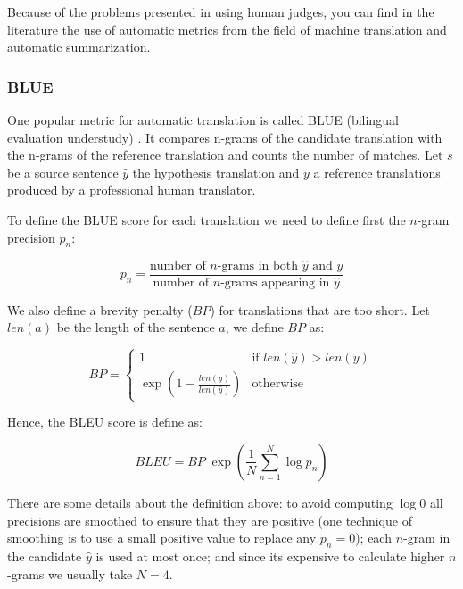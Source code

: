 Because of the problems presented in using human judges, you can find in the literature the use of automatic metrics from the field of machine translation and automatic summarization.

\subsubsection{BLUE}



One popular metric for automatic translation is called BLUE (bilingual evaluation understudy) \cite{Papineni2001}. It compares n-grams of the candidate translation with the n-grams of the reference translation and counts the number of matches. Let $s$ be a source sentence $\hat{y}$ the hypothesis translation and $y$ a reference translations produced by a professional human translator. 

To define the BLUE score for each translation we need to define first the $n$-gram precision $p_n$:

\begin{equation*}
p_n = \frac{\text{number of } n\text{-grams in both } \hat{y} \text{ and } y}{\text{number of } n\text{-grams appearing in } \hat{y}}
\end{equation*}    

We also define a brevity penalty ($BP$) for translations that are too short. Let $len(a)$ be the length of the sentence $a$, we define $BP$ as:

\begin{equation*}
BP=
\begin{cases}
1 & \text{if } len(\hat{y}) > len(y) \\
\exp\left( 1 - \frac{len(y)}{len(\hat{y})} \right) & \text{otherwise}
\end{cases}
\end{equation*} 


Hence, the BLEU score is define as:

\begin{equation*}
BLEU = BP \; \exp \left(\frac{1}{N}  \sum_{n=1}^{N} \log p_n \right)
\end{equation*}

There are some details about the definition above: to avoid computing $\log 0$ all precisions are smoothed to ensure that they are positive (one technique of smoothing is to use a small positive value to replace any $p_n=0$); each $n$-gram in the candidate $\hat{y}$ is used at most once; and since its expensive to calculate higher $n$-grams we usually take $N=4$.

